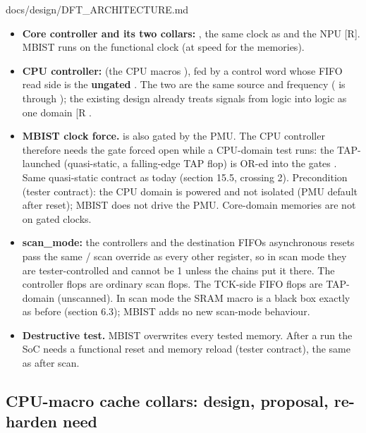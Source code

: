 \begin{relocated}{docs/design/DFT_ARCHITECTURE.md}
\begin{itemize}
\tightlist
\item
  \textbf{Core controller and its two collars:} , the
  same clock as  and the NPU {[}R{]}. MBIST runs
  on the functional clock (at speed for the memories).
\item
  \textbf{CPU controller:}  (the CPU
  macro\textquotesingle s ), fed by a control word whose
  FIFO read side is the \textbf{ungated} . The two
  are the same source and frequency ( is
   through ); the existing design
  already treats signals from  logic into
   logic as one domain {[}R
  \code{soc_top.sv:540-660}{]}.
\item
  \textbf{MBIST clock force.}  is also gated by the PMU.
  The CPU controller therefore needs the gate forced open while a
  CPU-domain test runs: the TAP-launched 
  (quasi-static, a falling-edge TAP flop) is OR-ed into the
  gate\textquotesingle s . Same quasi-static contract as
   today (section 15.5, crossing 2). Precondition (tester
  contract): the CPU domain is powered and not isolated (PMU default
  after reset); MBIST does not drive the PMU. Core-domain memories are
  not on gated clocks.
\item
  \textbf{scan\_\allowbreak{}mode:} the controller\textquotesingle s and
  the destination FIFO\textquotesingle s asynchronous resets pass the
  same  /  scan override as every
  other register, so in scan mode they are tester-controlled and
   cannot be 1 unless the chains put it there. The
  controller flops are ordinary scan flops. The TCK-side FIFO flops are
  TAP-domain (unscanned). In scan mode the SRAM macro is a black box
  exactly as before (section 6.3); MBIST adds no new scan-mode
  behaviour.
\item
  \textbf{Destructive test.} MBIST overwrites every tested memory. After
  a run the SoC needs a functional reset and memory reload (tester
  contract), the same as after scan.
\end{itemize}

\subsection{CPU-macro cache collars: design, proposal, re-harden
need}\label{tm:ch:dft-architecture:167-cpu-macro-cache-collars-design-proposal-re-harden-need}


\end{relocated}
